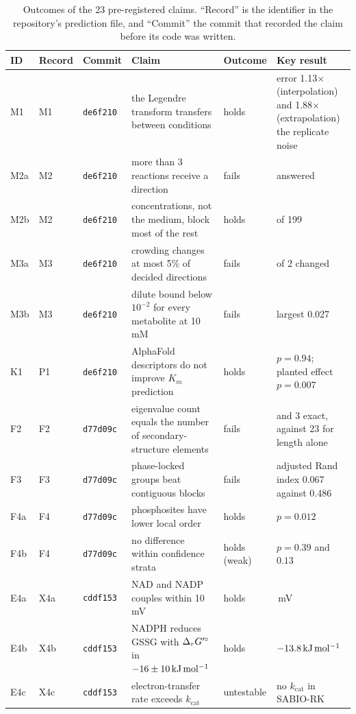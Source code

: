 \begin{table}[t]
\centering
\caption{Outcomes of the 23 pre-registered claims. ``Record'' is the identifier in the repository's prediction file, and ``Commit'' the commit that recorded the claim before its code was written.}
\label{tab:outcomes}
\footnotesize
\begin{tabularx}{\textwidth}{@{}lll>{\raggedright\arraybackslash}Xl>{\raggedright\arraybackslash}p{5.0cm}@{}}
\toprule
ID & Record & Commit & Claim & Outcome & Key result \\
\midrule
M1  & M1  & \texttt{de6f210} & the Legendre transform transfers between conditions & holds & error 1.13$\times$ (interpolation) and 1.88$\times$ (extrapolation) the replicate noise \\
M2a & M2  & \texttt{de6f210} & more than 3 reactions receive a direction & fails & 2 answered \\
M2b & M2  & \texttt{de6f210} & concentrations, not the medium, block most of the rest & holds & 156 of 199 \\
M3a & M3  & \texttt{de6f210} & crowding changes at most 5\% of decided directions & fails & 2 of 2 changed \\
M3b & M3  & \texttt{de6f210} & dilute bound below $10^{-2}$ for every metabolite at 10\,mM & fails & largest 0.027 \\
K1  & P1  & \texttt{de6f210} & AlphaFold descriptors do not improve $K_m$ prediction & holds & $p=0.94$; planted effect $p=0.007$ \\
F2  & F2  & \texttt{d77d09c} & eigenvalue count equals the number of secondary-structure elements & fails & 0 and 3 exact, against 23 for length alone \\
F3  & F3  & \texttt{d77d09c} & phase-locked groups beat contiguous blocks & fails & adjusted Rand index 0.067 against 0.486 \\
F4a & F4  & \texttt{d77d09c} & phosphosites have lower local order & holds & $p=0.012$ \\
F4b & F4  & \texttt{d77d09c} & no difference within confidence strata & holds (weak) & $p=0.39$ and $0.13$ \\
E4a & X4a & \texttt{cddf153} & NAD and NADP couples within 10\,mV & holds & 1.6\,mV \\
E4b & X4b & \texttt{cddf153} & NADPH reduces GSSG with $\Delta_r G'^\circ$ in $-16\pm10\,\mathrm{kJ\,mol^{-1}}$ & holds & $-13.8\,\mathrm{kJ\,mol^{-1}}$ \\
E4c & X4c & \texttt{cddf153} & electron-transfer rate exceeds $k_{\mathrm{cat}}$ & untestable & no $k_{\mathrm{cat}}$ in SABIO-RK \\

\end{tabularx}
\end{table}
